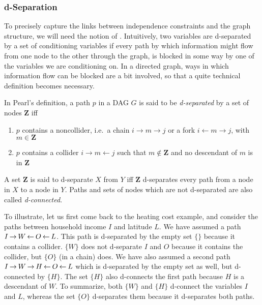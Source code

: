 \largerpage
\subsubsection{d-Separation}
To precisely capture the links between independence constraints and the graph structure, we will need the notion of \textit{}. Intuitively, two variables are d-separated by a set of conditioning variables if every path by which information might flow from one node to the other through the graph, is blocked in some way by one of the variables we are conditioning on. In a directed graph, ways in which information flow can be blocked are a bit involved, so that a quite technical definition becomes necessary.

In Pearl's definition, a path $p$ in a DAG $G$ is said to be \textit{d-separated} by a set of nodes $\mathbf{Z}$ iff
\begin{enumerate}
  \item $p$ contains a noncollider, i.e.\ a chain $i \rightarrow m \rightarrow j$ or a fork $i \leftarrow m \rightarrow j$, with $m \in \mathbf{Z}$
  \item $p$ contains a collider $i \rightarrow m \leftarrow j$ such that $m \notin \mathbf{Z}$ and no descendant of $m$ is in $\mathbf{Z}$
\end{enumerate}
A set $\mathbf{Z}$ is said to d-separate $X$ from $Y$ iff $\mathbf{Z}$ d-separates every path from a node in $X$ to a node in $Y$. Paths and sets of nodes which are not d-separated are also called \textit{d-connected}.

To illustrate, let us first come back to the heating cost example, and consider the paths between household income $I$ and latitude $L$. We have assumed a path $I \kern 2pt\hbox{$\rightarrow$}\kern 2pt W \kern 2pt\hbox{$\leftarrow$}\kern 2pt O \kern 2pt\hbox{$\leftarrow$}\kern 2pt L$. This path is d-separated by the empty set $\{\}$ because it contains a collider. $\{W\}$ does not d-separate $I$ and $O$ because it contains the collider, but $\{O\}$ (in a chain) does. We have also assumed a second path $I \kern 2pt\hbox{$\rightarrow$}\kern 2pt W \kern 2pt\hbox{$\rightarrow$}\kern 2pt H \kern 2pt\hbox{$\leftarrow$}\kern 2pt O \kern 2pt\hbox{$\leftarrow$}\kern 2pt L$ which is d-separated by the empty set as well, but d-connected by $\{H\}$. The set $\{H\}$ also d-connects the first path because $H$ is a descendant of $W$. To summarize, both $\{W\}$ and $\{H\}$ d-connect the variables $I$ and $L$, whereas the set $\{O\}$ d-separates them because it d-separates both paths.

